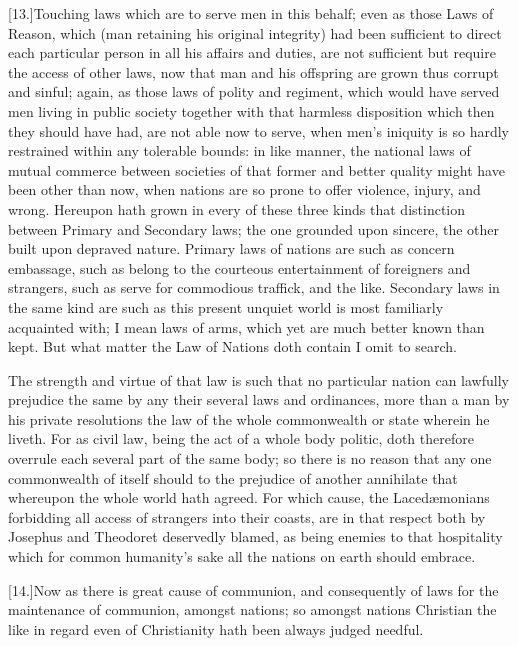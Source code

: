 [13.]Touching laws which are to serve men in this behalf; even as those Laws of Reason, which (man retaining his original integrity) had been sufficient to direct each particular person in all his affairs and duties, are not sufficient but require the access of other laws, now that man and his offspring are grown thus corrupt and sinful; again, as those laws of polity and regiment, which would have served men living in public society together with that harmless disposition which then they should have had, are not able now to serve, when men’s iniquity is so hardly restrained within any tolerable bounds: in like manner, the national laws of mutual commerce between societies of that former and better quality might have been other than now, when nations are so prone to offer violence, injury, and wrong. Hereupon hath grown in every of these three kinds that distinction between Primary and Secondary laws; the one grounded upon sincere, the other built upon depraved nature. Primary laws of nations are such as concern embassage, such as belong to the courteous entertainment of foreigners and strangers, such as serve for commodious traffick, and the like. Secondary laws in the same kind are such as this present unquiet world is most familiarly acquainted with; I mean laws of arms, which yet are much better known than kept. But what matter the Law of Nations doth contain I omit to search.

The strength and virtue of that law is such that no particular nation can lawfully prejudice the same by any their several laws and ordinances, more than a man by his private resolutions the law of the whole commonwealth or state wherein he liveth. For as civil law, being the act of a whole body politic, doth therefore overrule each several part of the same body; so there is no reason that any one commonwealth of itself should to the prejudice of another  annihilate that whereupon the whole world hath agreed. For which cause, the Lacedæmonians forbidding all access of strangers into their coasts, are in that respect both by Josephus and Theodoret deservedly blamed, as being enemies to that hospitality which for common humanity’s sake all the nations on earth should embrace.

[14.]Now as there is great cause of communion, and consequently of laws for the maintenance of communion, amongst nations; so amongst nations Christian the like in regard even of Christianity hath been always judged needful.

